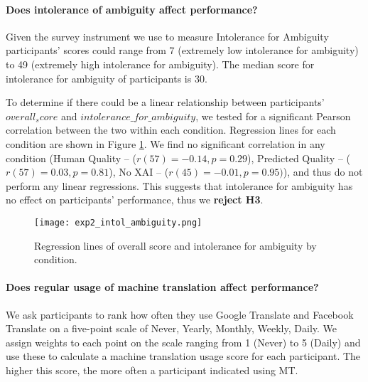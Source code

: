 \paragraph{\textbf{Does intolerance of ambiguity affect performance?}} 

Given the survey instrument we use to measure Intolerance for Ambiguity\cite{gellerTolerance1993} participants’ scores could range from 7 (extremely low intolerance for ambiguity) to 49 (extremely high intolerance for ambiguity). The median score for intolerance for ambiguity of participants is 30. 

To determine if there could be a linear relationship between participants' $overall_score$ and $intolerance\_for\_ambiguity$, we tested for a significant Pearson correlation between the two within each condition. Regression lines for each condition are shown in Figure \ref{fig:exp_intol_ambiguity}. We find no significant correlation in any condition (Human Quality -- ($r(57) = -0.14, p = 0.29$), Predicted Quality --  ($r(57) = 0.03, p = 0.81$), No XAI -- ($r(45) = -0.01, p = 0.95)$), and thus do not perform any linear regressions. This suggests that intolerance for ambiguity has no effect on participants' performance, thus we \textbf{reject H3}. 

\begin{figure}[h!]
    \centering
    \texttt{[image: exp2\_intol\_ambiguity.png]}
    \caption{Regression lines of overall score and intolerance for ambiguity by condition.}
    \label{fig:exp_intol_ambiguity}
\end{figure}

\paragraph{\textbf{Does regular usage of machine translation affect performance?}}

We ask participants to rank how often they use Google Translate and Facebook Translate on a five-point scale of Never, Yearly, Monthly, Weekly, Daily. We assign weights to each point on the scale ranging from 1 (Never) to 5 (Daily) and use these to calculate a machine translation usage score for each participant. The higher this score, the more often a participant indicated using MT. 

